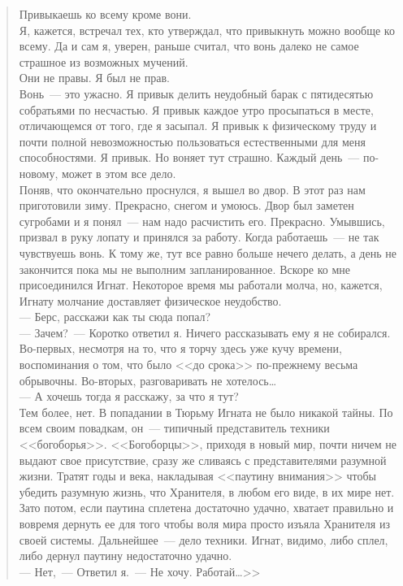 \begin{quote}
Привыкаешь ко всему кроме вони. \\

Я, кажется, встречал тех, кто утверждал, что привыкнуть можно вообще ко всему. 
Да и сам я, уверен, раньше считал, что вонь далеко не самое страшное из 
возможных мучений.\\

Они не правы. Я был не прав.\\

Вонь~--- это ужасно. Я привык делить неудобный барак с пятидесятью собратьями 
по несчастью. Я привык каждое утро просыпаться в месте, отличающемся от того, где 
я засыпал. Я привык к физическому труду и почти полной невозможностью 
пользоваться естественными для меня способностями. Я привык. Но воняет тут страшно. Каждый 
день~--- по-новому, может в этом все дело.\\

Поняв, что окончательно проснулся, я вышел во двор. В этот раз нам приготовили 
зиму. Прекрасно, снегом и умоюсь. Двор был заметен сугробами и я понял~--- нам 
надо расчистить его. Прекрасно. Умывшись, призвал в руку лопату и принялся за 
работу. Когда работаешь~--- не так чувствуешь вонь. К тому же, тут все равно 
больше нечего делать, а день не закончится пока мы не выполним запланированное. 
Вскоре ко мне присоединился Игнат. Некоторое время мы работали молча, но, 
кажется, Игнату молчание доставляет физическое неудобство.\\
--- Берс, расскажи как ты сюда попал?\\
--- Зачем?~--- Коротко ответил я. Ничего рассказывать ему я не собирался. 
Во-первых, несмотря на то, что я торчу здесь уже кучу времени, воспоминания о том, что 
было <<до срока>> по-прежнему весьма обрывочны. Во-вторых, разговаривать не 
хотелось\ldots\\
--- А хочешь тогда я расскажу, за что я тут?\\

Тем более, нет. В попадании в Тюрьму Игната не было никакой тайны. По всем 
своим повадкам, он~--- типичный представитель техники <<богоборья>>. <<Богоборцы>>, 
приходя в новый мир, почти ничем не выдают свое присутствие, сразу же сливаясь с 
представителями разумной жизни. Тратят годы и века, накладывая <<паутину 
внимания>> чтобы убедить разумную жизнь, что Хранителя, в любом его виде, в их 
мире нет. Зато потом, если паутина сплетена достаточно удачно, хватает 
правильно и вовремя дернуть ее для того чтобы воля мира просто изъяла Хранителя из своей 
системы. Дальнейшее~--- дело техники. Игнат, видимо, либо сплел, либо дернул 
паутину недостаточно удачно.\\

\noindent --- Нет,~--- Ответил я.~--- Не хочу. Работай\ldots>>
\end{quote}

